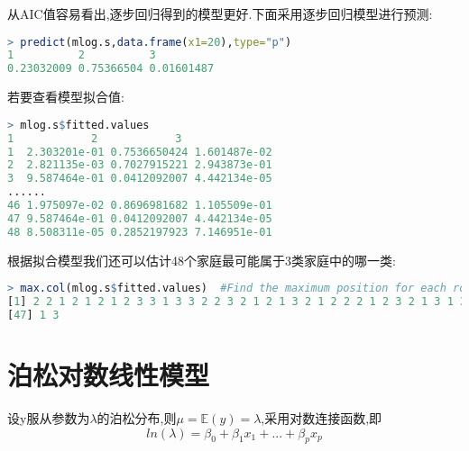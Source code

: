 \documentclass[11pt,a4paper,oneside]{book}
\begin{document}
从AIC值容易看出,逐步回归得到的模型更好.下面采用逐步回归模型进行预测:
\begin{lstlisting}[language=r]
> predict(mlog.s,data.frame(x1=20),type="p")
1          2          3 
0.23032009 0.75366504 0.01601487 
\end{lstlisting}

若要查看模型拟合值:
\begin{lstlisting}[language=r]
> mlog.s$fitted.values
1            2            3
1  2.303201e-01 0.7536650424 1.601487e-02
2  2.821135e-03 0.7027915221 2.943873e-01
3  9.587464e-01 0.0412092007 4.442134e-05
......
46 1.975097e-02 0.8696981682 1.105509e-01
47 9.587464e-01 0.0412092007 4.442134e-05
48 8.508311e-05 0.2852197923 7.146951e-01
\end{lstlisting}
根据拟合模型我们还可以估计48个家庭最可能属于3类家庭中的哪一类:
\begin{lstlisting}[language=r]
> max.col(mlog.s$fitted.values)  #Find the maximum position for each row of a matrix
[1] 2 2 1 2 1 2 1 2 3 3 1 3 3 2 2 3 2 1 2 1 3 2 1 2 2 2 1 2 3 2 1 3 1 3 1 3 1 2 2 1 1 2 2 1 2 2
[47] 1 3
\end{lstlisting}

\section{泊松对数线性模型}
设y服从参数为$ \lambda $的泊松分布,则$ \mu=\mathbb{E}(y)=\lambda $,采用对数连接函数,即\[ln(\lambda)=\beta_0+\beta_1x_1+...+\beta_px_p\]
\end{document}
